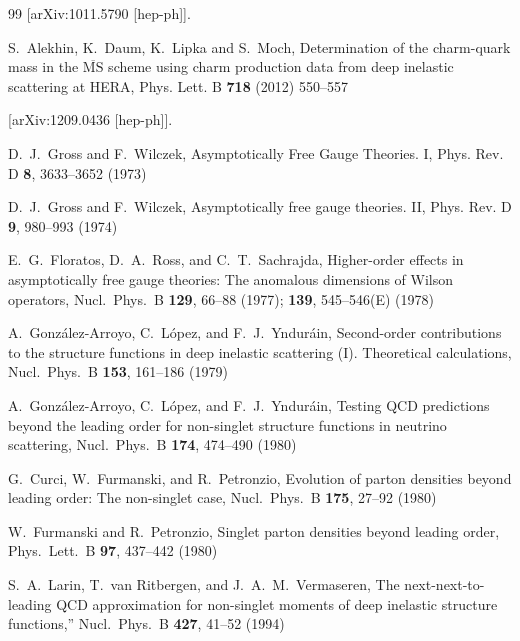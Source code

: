 \documentclass[
 twocolumn,
 superscriptaddress,
 preprintnumbers,
 nofootinbib,
 amsmath,amssymb,
 aps,
 prl
 ]{revtex4-2}
\begin{document}
\begin{thebibliography}{99}
[arXiv:1011.5790 [hep-ph]].



S.~Alekhin, K.~Daum, K.~Lipka and S.~Moch,
Determination of the charm-quark mass in the $\overline{\mathrm{MS}}$ scheme using charm production data from deep inelastic scattering at HERA,
Phys. Lett. B \textbf{718} (2012) 550--557

[arXiv:1209.0436 [hep-ph]].



D.~J.~Gross and F.~Wilczek,
Asymptotically Free Gauge Theories. I,
Phys. Rev. D \textbf{8}, 3633--3652 (1973)




D.~J.~Gross and F.~Wilczek,
Asymptotically free gauge theories. II,
Phys. Rev. D \textbf{9}, 980--993 (1974)




  E.~G.~Floratos, D.~A.~Ross, and C.~T.~Sachrajda,
  Higher-order effects in asymptotically free gauge theories: The anomalous dimensions of Wilson operators,
  Nucl.\ Phys.\ B {\bf 129}, 66--88 (1977); {\bf 139}, 545--546(E) (1978)







  A.~Gonz\'alez-Arroyo, C.~L\'opez, and F.~J.~Yndur\'ain,
  Second-order contributions to the structure functions in deep inelastic scattering (I). Theoretical calculations,
  Nucl.\ Phys.\ B {\bf 153}, 161--186 (1979)





A.~Gonz\'alez-Arroyo, C.~L\'opez, and F.~J.~Yndur\'ain,
Testing QCD predictions beyond the leading order for non-singlet structure functions in neutrino scattering,
Nucl.\ Phys.\ B \textbf{174}, 474--490 (1980)




G.~Curci, W.~Furmanski, and R.~Petronzio,
Evolution of parton densities beyond leading order: The non-singlet case,
Nucl.\ Phys.\ B \textbf{175}, 27--92 (1980)




W.~Furmanski and R.~Petronzio,
Singlet parton densities beyond leading order,
Phys.\ Lett.\ B \textbf{97}, 437--442 (1980)




S.~A.~Larin, T.~van Ritbergen, and J.~A.~M.~Vermaseren,
The next-next-to-leading QCD approximation for non-singlet moments of deep inelastic structure functions,''
Nucl.\ Phys.\ B \textbf{427}, 41--52 (1994)





\end{thebibliography}
\end{document}
